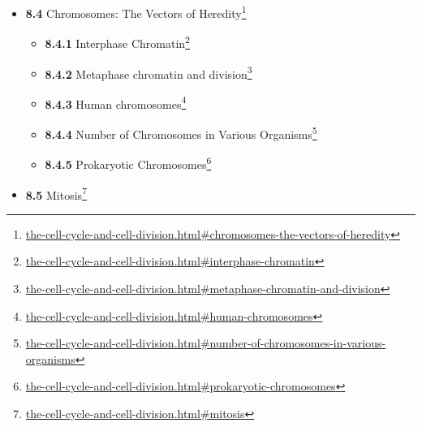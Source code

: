 \documentclass[
]{article}
\providecommand{\tightlist}{%
  \setlength{\itemsep}{0pt}\setlength{\parskip}{0pt}}
\providecommand{\tightlist}{%
  \setlength{\itemsep}{0pt}\setlength{\parskip}{0pt}}
\let\rmarkdownfootnote\footnote%
\def\footnote{\protect\rmarkdownfootnote}
\renewcommand{\href}[2]{#2\footnote{\url{#1}}}
\theoremstyle{definition}
\theoremstyle{definition}
\theoremstyle{definition}
\theoremstyle{remark}
\begin{document}
\begin{itemize}
\begin{itemize}
    \begin{itemize}
    \tightlist
    \item
      \href{the-cell-cycle-and-cell-division.html\#g0-phase-quiescence}{\emph{}\textbf{8.3.1}
      G0 phase (quiescence)}
    \item
      \href{the-cell-cycle-and-cell-division.html\#interphase}{\emph{}\textbf{8.3.2}
      Interphase}
    \item
      \href{the-cell-cycle-and-cell-division.html\#g1-phase-first-growth-phase-or-post-mitotic-gap-phase}{\emph{}\textbf{8.3.3}
      G1 phase (First growth phase or Post mitotic gap phase)}
    \item
      \href{the-cell-cycle-and-cell-division.html\#s-phase-dna-replication}{\emph{}\textbf{8.3.4}
      S phase (DNA Replication)}
    \item
      \href{the-cell-cycle-and-cell-division.html\#g2-phase-growth}{\emph{}\textbf{8.3.5}
      G2 phase (growth)}
    \item
      \href{the-cell-cycle-and-cell-division.html\#mitotic-phase-chromosome-separation}{\emph{}\textbf{8.3.6}
      Mitotic Phase (Chromosome Separation)}
    \end{itemize}
  \item
    \href{the-cell-cycle-and-cell-division.html\#chromosomes-the-vectors-of-heredity}{\emph{}\textbf{8.4}
    Chromosomes: The Vectors of Heredity}

    \begin{itemize}
    \tightlist
    \item
      \href{the-cell-cycle-and-cell-division.html\#interphase-chromatin}{\emph{}\textbf{8.4.1}
      Interphase Chromatin}
    \item
      \href{the-cell-cycle-and-cell-division.html\#metaphase-chromatin-and-division}{\emph{}\textbf{8.4.2}
      Metaphase chromatin and division}
    \item
      \href{the-cell-cycle-and-cell-division.html\#human-chromosomes}{\emph{}\textbf{8.4.3}
      Human chromosomes}
    \item
      \href{the-cell-cycle-and-cell-division.html\#number-of-chromosomes-in-various-organisms}{\emph{}\textbf{8.4.4}
      Number of Chromosomes in Various Organisms}
    \item
      \href{the-cell-cycle-and-cell-division.html\#prokaryotic-chromosomes}{\emph{}\textbf{8.4.5}
      Prokaryotic Chromosomes}
    \end{itemize}
  \item
    \href{the-cell-cycle-and-cell-division.html\#mitosis}{\emph{}\textbf{8.5}
    Mitosis}


\end{itemize}
\end{itemize}
\end{document}
